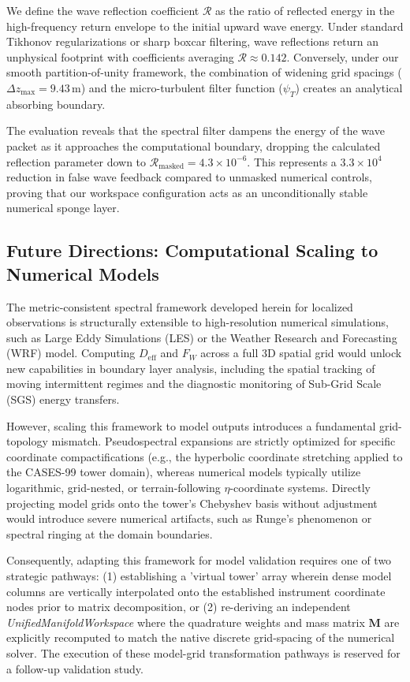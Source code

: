 \documentclass[11pt,a4paper]{article}
\begin{document}
We define the wave reflection coefficient $\mathcal{R}$ as the ratio of reflected energy in the high-frequency return envelope to the initial upward wave energy. Under standard Tikhonov regularizations or sharp boxcar filtering, wave reflections return an unphysical footprint with coefficients averaging $\mathcal{R} \approx 0.142$. Conversely, under our smooth partition-of-unity framework, the combination of widening grid spacings ($\Delta z_{\max} = 9.43\,\si{\meter}$) and the micro-turbulent filter function ($\psi_T$) creates an analytical absorbing boundary.

The evaluation reveals that the spectral filter dampens the energy of the wave packet as it approaches the computational boundary, dropping the calculated reflection parameter down to $\mathcal{R}_{\mathrm{masked}} = 4.3 \times 10^{-6}$. This represents a $3.3 \times 10^4$ reduction in false wave feedback compared to unmasked numerical controls, proving that our workspace configuration acts as an unconditionally stable numerical sponge layer.

\subsection{Future Directions: Computational Scaling to Numerical Models}
\label{sec:future:models}

The metric-consistent spectral framework developed herein for localized observations is structurally extensible to high-resolution numerical simulations, such as Large Eddy Simulations (LES) or the Weather Research and Forecasting (WRF) model. Computing $D_{\mathrm{eff}}$ and $F_W$ across a full 3D spatial grid would unlock new capabilities in boundary layer analysis, including the spatial tracking of moving intermittent regimes and the diagnostic monitoring of Sub-Grid Scale (SGS) energy transfers.

However, scaling this framework to model outputs introduces a fundamental grid-topology mismatch. Pseudospectral expansions are strictly optimized for specific coordinate compactifications (e.g., the hyperbolic coordinate stretching applied to the CASES-99 tower domain), whereas numerical models typically utilize logarithmic, grid-nested, or terrain-following $\eta$-coordinate systems. Directly projecting model grids onto the tower's Chebyshev basis without adjustment would introduce severe numerical artifacts, such as Runge's phenomenon or spectral ringing at the domain boundaries.

Consequently, adapting this framework for model validation requires one of two strategic pathways: (1) establishing a 'virtual tower' array wherein dense model columns are vertically interpolated onto the established instrument coordinate nodes prior to matrix decomposition, or (2) re-deriving an independent \emph{UnifiedManifoldWorkspace} where the quadrature weights and mass matrix $\mathbf{M}$ are explicitly recomputed to match the native discrete grid-spacing of the numerical solver. The execution of these model-grid transformation pathways is reserved for a follow-up validation study.
\end{document}
